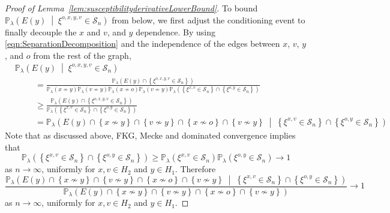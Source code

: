 \documentclass[10pt,a4paper,dvipsnames]{article}
\theoremstyle{definition}
\theoremstyle{remark}
\newcommand{\pla}{\mathbb P_\lambda}
\newcommand{\Scal}{\mathcal{S}}
\newcommand{\orig}{o}
\numberwithin{equation}{section}
\begin{document}
\begin{proof}[Proof of Lemma~\ref{lem:susceptibilityderivativeLowerBound}]
    To bound $\pla\left(E(y)\;\middle|\;\xi^{\orig,x,y,v}\in\Scal_n\right)$ from below, we first adjust the conditioning event to finally decouple the $x$ and $v$, and $y$ dependence. By using \eqref{eqn:SeparationDecomposition} and the independence of the edges between $x$, $v$, $y$, and $\orig$ from the rest of the graph, 
    \begin{align}\label{eq:EXiSn}
        &\pla\left(E(y)\;\middle|\;\xi^{\orig,x,y,v}\in\Scal_n\right)\nonumber \\
        &\hspace{1cm}= \frac{\pla\left(E(y)\cap\left\{\xi^{\orig,x,y,v}\in\Scal_n\right\}\right)}{\pla\left(x\not\sim y\right)\pla\left(v\not\sim y\right)\pla\left(x\not\sim \orig\right)\pla\left(v\not\sim y\right)\pla\left(\left\{\xi^{x,v}\in\Scal_n\right\}\cap \left\{\xi^{\orig,y}\in\Scal_n\right\}\right)}\nonumber\\
        &\hspace{1cm}\geq \frac{\pla\left(E(y)\cap\left\{\xi^{\orig,x,y,v}\in\Scal_n\right\}\right)}{\pla\left(\left\{\xi^{x,v}\in\Scal_n\right\}\cap \left\{\xi^{\orig,y}\in\Scal_n\right\}\right)}\nonumber\\
        &\hspace{1cm} = \pla\left(E(y)\cap\left\{x\not\sim y\right\}\cap \left\{v\not\sim y\right\}\cap\left\{x\not\sim \orig\right\}\cap\left\{v\not\sim y\right\}\;\middle|\;\left\{\xi^{x,v}\in\Scal_n\right\}\cap \left\{\xi^{\orig,y}\in\Scal_n\right\}\right)
    \end{align}
    Note that as discussed above, FKG, Mecke and dominated convergence implies that
    \begin{equation}
        \pla\left(\left\{\xi^{x,v}\in\Scal_n\right\}\cap \left\{\xi^{\orig,y}\in\Scal_n\right\}\right) \geq \pla\left(\xi^{x,v}\in\Scal_n\right)\pla\left(\xi^{\orig,y}\in\Scal_n\right)\to 1
    \end{equation}
    as $n\to \infty$, uniformly for $x,v\in H_2$ and $y\in H_1$. Therefore
    \begin{equation}\label{eq:RatioPEPE}
        \frac{\pla\left(E(y)\cap\left\{x\not\sim y\right\}\cap \left\{v\not\sim y\right\}\cap\left\{x\not\sim \orig\right\}\cap\left\{v\not\sim y\right\}\;\middle|\;\left\{\xi^{x,v}\in\Scal_n\right\}\cap \left\{\xi^{\orig,y}\in\Scal_n\right\}\right)}{\pla\left(E(y)\cap\left\{x\not\sim y\right\}\cap \left\{v\not\sim y\right\}\cap\left\{x\not\sim \orig\right\}\cap\left\{v\not\sim y\right\}\right)} \to 1
    \end{equation}
    as $n\to \infty$, uniformly for $x,v\in H_2$ and $y\in H_1$. 

\end{proof}
\end{document}
